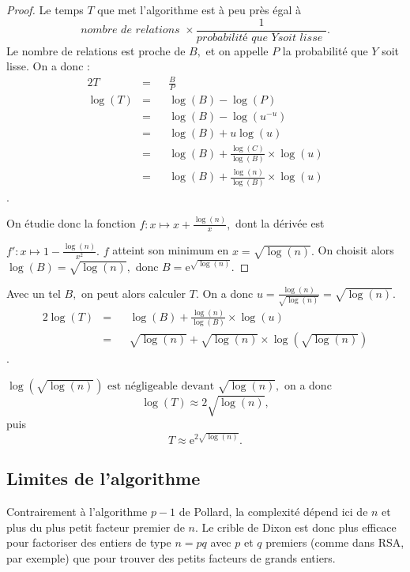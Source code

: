 \documentclass[french, 12pt, titlepage]{article}
\begin{document}
\begin{proof}

Le temps $T$ que met l'algorithme est à peu près égal à
\[\textit{nombre de relations } \times \frac{1}{\textit{probabilité que
  } Y \textit{soit lisse }}.\] Le nombre de relations est proche de $B,$ et on
appelle $P$ la probabilité que $Y$ soit lisse. On a donc : 
\begin{alignat*}{2}
T & = && \frac{B}{P} \\
\log(T) & = && \log(B) - \log(P) \\
 & = && \log(B) - \log(u^{-u}) \\
 & = && \log(B) + u\log(u) \\
 & = && \log(B) + \frac{\log(C)}{\log(B)} \times \log(u) \\
 & = && \log(B) + \frac{\log(n)}{\log(B)} \times \log(u)
\end{alignat*}.     

On étudie donc la fonction $f : x \mapsto x + \frac{\log(n)}{x},$ dont
la dérivée est 

\noindent $f' : x \mapsto 1 - \frac{\log(n)}{x^2}.$ $f$ atteint
son minimum en $x = \sqrt{\log(n)}.$ On choisit alors $\log(B) = \sqrt{\log(n)},$ donc $B = \text{e}^{\sqrt{\log(n)}}.$ 
\end{proof}

Avec un tel $B,$ on peut alors calculer $T.$ On a donc $u = \frac{\log(n)}{\sqrt{\log(n)}} = \sqrt{\log(n)}.$
\begin{alignat*}{2}
\log(T) & = && \log(B) + \frac{\log(n)}{\log(B)} \times \log(u) \\
 & = && \sqrt{\log(n)} + \sqrt{\log(n)} \times \log(\sqrt{\log(n)}) 
\end{alignat*}.

$\log(\sqrt{\log(n)}) \text{ est négligeable devant } \sqrt{\log(n)},$
on a donc
\[\log(T) \approx 2\sqrt{\log(n)},\] puis
\[T \approx \text{e}^{2\sqrt{\log(n)}}.\]

\subsection{Limites de l'algorithme}

Contrairement à l'algorithme $p - 1$ de Pollard, la complexité dépend
ici de $n$ et plus du plus petit facteur premier de $n.$ Le crible de
Dixon est donc plus efficace pour factoriser des entiers de type $n =
pq$ avec $p$ et $q$ premiers (comme dans RSA, par exemple) que pour trouver des petits facteurs de
grands entiers.
\end{document}
